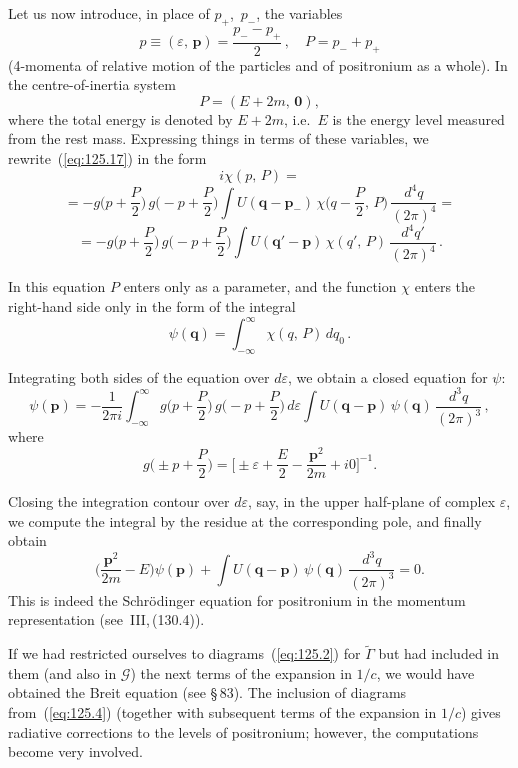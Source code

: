 Let us now introduce, in place of $p_+$,~$p_-$, the variables
\[
p \equiv (\varepsilon,\,\mathbf{p}) = \frac{p_- - p_+}{2}\,, \quad P = p_- + p_+
\]
(4-momenta of relative motion of the particles and of positronium as a whole). In the centre-of-inertia system
\[
P = (E + 2m,\,\mathbf{0}),
\]
where the total energy is denoted by $E + 2m$, i.e.\ $E$ is the energy level measured from the rest mass. Expressing things in terms of these variables, we rewrite~(\ref{eq:125.17}) in the form
\[
i\chi(p,\,P) =
\]
\[
= -g\biggl(p + \frac{P}{2}\biggr)\,g\biggl(-p + \frac{P}{2}\biggr) \int U(\mathbf{q} - \mathbf{p}_-)\,\chi\biggl(q - \frac{P}{2},\,P\biggr)\,\frac{d^4 q}{(2\pi)^4} =
\]
\[
= -g\biggl(p + \frac{P}{2}\biggr)\,g\biggl(-p + \frac{P}{2}\biggr) \int U(\mathbf{q}' - \mathbf{p})\,\chi(q',\,P)\,\frac{d^4 q'}{(2\pi)^4}\,.
\]

In this equation $P$ enters only as a parameter, and the function $\chi$ enters the right-hand side only in the form of the integral
\[
\psi(\mathbf{q}) = \int_{-\infty}^{\infty} \chi(q,\,P)\,dq_0\,.
\]

Integrating both sides of the equation over $d\varepsilon$, we obtain a closed equation for $\psi$:
\[
\psi(\mathbf{p}) = -\frac{1}{2\pi i} \int_{-\infty}^{\infty} g\biggl(p + \frac{P}{2}\biggr)\,g\biggl(-p + \frac{P}{2}\biggr)\,d\varepsilon \int U(\mathbf{q} - \mathbf{p})\,\psi(\mathbf{q})\,\frac{d^3 q}{(2\pi)^3}\,,
\]
where
\[
g\biggl(\pm p + \frac{P}{2}\biggr) = \biggl[\pm\varepsilon + \frac{E}{2} - \frac{\mathbf{p}^2}{2m} + i0\biggr]^{-1}.
\]


Closing the integration contour over $d\varepsilon$, say, in the upper half-plane of complex $\varepsilon$, we compute the integral by the residue at the corresponding pole, and finally obtain
\begin{equation}
\biggl(\frac{\mathbf{p}^2}{2m} - E\biggr)\psi(\mathbf{p}) + \int U(\mathbf{q} - \mathbf{p})\,\psi(\mathbf{q})\,\frac{d^3 q}{(2\pi)^3} = 0.
\label{eq:125.18}
\end{equation}
This is indeed the Schr\"odinger equation for positronium in the momentum representation (see~III,\,(130.4)).

If we had restricted ourselves to diagrams~(\ref{eq:125.2}) for $\widetilde{\Gamma}$ but had included in them (and also in $\mathcal{G}$) the next terms of the expansion in $1/c$, we would have obtained the Breit equation (see \S\,83). The inclusion of diagrams from~(\ref{eq:125.4}) (together with subsequent terms of the expansion in $1/c$) gives radiative corrections to the levels of positronium; however, the computations become very involved.

